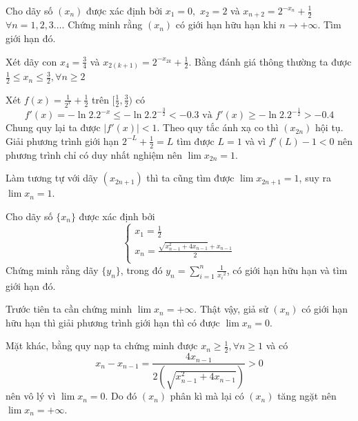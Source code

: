 \documentclass[11pt]{scrartcl}
\begin{document}
\begin{itemize}[label=, leftmargin=0em, itemsep=0.5em]
    \begin{bt}
        Cho dãy số $ (x_n)$ được xác định bởi $ x_1 = 0,$ $ x_2 = 2$ và $ x_{n+2} = 2^{-x_n} + \frac{1}{2}$ $ \forall n = 1,2,3 \ldots$. Chứng minh rằng $(x_n)$ có giới hạn hữu hạn khi $ n \to +\infty.$ Tìm giới hạn đó.
    \end{bt}

    \begin{sol}
        Xét dãy con $x_4 = \frac{3}{4}$ và $x_{2(k+1)} = 2^{-x_{2k}} + \frac{1}{2}$. Bằng đánh giá thông thường ta được $\frac{1}{2} \leq x_n \leq \frac{3}{2}, \forall n \geq 2$ 
        
        
        Xét $f(x) = \frac{1}{2^x} + \frac{1}{2}$ trên $[\frac{1}{2}, \frac{3}{2})$ có 
        \[f'(x) = -\ln2. 2^{-x} \leq -\ln2. 2^{-\frac{3}{2}} < -0.3 \text{ và } f'(x) \geq -\ln2. 2^{-\frac{1}{2}} > -0.4\]
        Chung quy lại ta được $|f'(x)| < 1$. Theo quy tắc ánh xạ co thì $(x_{2n})$ hội tụ. Giải phương trình giới hạn $2^{-L} + \frac{1}{2} = L$ tìm được $L = 1$ và vì $f'(L) - 1 < 0$ nên phương trình chỉ có duy nhất nghiệm nên $\lim x_{2n} = 1$. 


        Làm tương tự với dãy $(x_{2n + 1})$ thì ta cũng tìm được $\lim x_{2n + 1 } = 1$, suy ra $\lim x_n = 1$.
    \end{sol}
    \begin{bt}
        Cho dãy số $ \{x_n\}$ được xác định bởi \[ \left\{ \begin{array}{l}x_1  = \frac{1}{2} \\x_n  = \frac{{\sqrt {x_{n - 1} ^2  + 4x_{n - 1} }  + x_{n - 1} }}{2} \\\end{array} \right.\]
Chứng minh rằng dãy $ \{y_n\}$, trong đó $\displaystyle  y_n=\sum_{i=1}^{n}\frac{1}{{{x}_{i}}^{2}}$, có giới hạn hữu hạn và tìm giới hạn đó.
    \end{bt}

    \begin{sol}
        Trước tiên ta cần chứng minh $\lim x_n = +\infty$. Thật vậy, giả sử $(x_n)$ có giới hạn hữu hạn thì giải phương trình giới hạn thì có được $\lim x_n = 0$. 
        
        
        Mặt khác, bằng quy nạp ta chứng minh được $x_n \geq \frac{1}{2}, \forall n \geq 1$ và có \[x_n - x_{n - 1} = \frac{4x_{n - 1}}{2(\sqrt{x_{n-1}^2 + 4x_{n-1}})} > 0\] nên vô lý vì $\lim x_n = 0$. Do đó $(x_n)$ phân kì mà lại có $(x_n)$ tăng ngặt nên $\lim x_n = +\infty$.



\end{sol}
\end{itemize}
\end{document}
